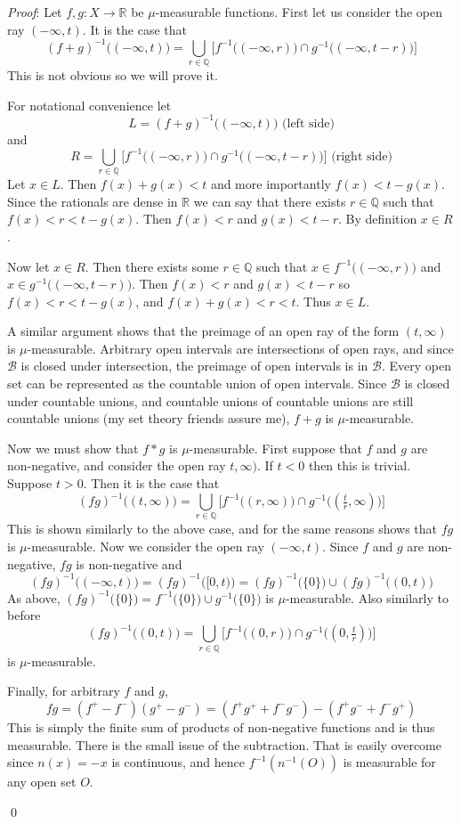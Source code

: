 \documentclass[12pt]{article}
\renewenvironment{proof}{\hspace{-4 ex} \emph{Proof}:}{\qed}
\newcommand{\RR}{\mathbb{R}}
\newcommand{\QQ}{\mathbb{Q}}
\newcommand{\BB}{\mathcal{B}}
\begin{document}
\begin{proof}
	Let $f,g: X \to \RR$ be $\mu$-measurable functions. First let us consider the open ray $(-\infty,t)$. It is the case that 
	$$
	(f+g)^{-1}\big ( (-\infty,t) \big) = \bigcup_{r \in \QQ} \Big[ f^{-1}\big( (-\infty,r) \big) \cap g^{-1}\big( (-\infty,t-r) \big) \Big]
	$$
	This is not obvious so we will prove it. \bigbreak
	
	For notational convenience let
	$$
	L = (f+g)^{-1}\big ( (-\infty,t) \big) \text{\ \ \ \ (left side)}
	$$
	and 
	$$
	R = \bigcup_{r \in \QQ} \Big[ f^{-1}\big( (-\infty,r) \big) \cap g^{-1}\big( (-\infty,t-r) \big) \Big] \text{\ \ \ \ \ (right side)}
	$$
	Let $x \in L$. Then $f(x)+g(x) < t$ and more importantly $f(x) < t - g(x)$. Since the rationals are dense in $\RR$ we can say that there exists $r \in \QQ$ such that $f(x) < r < t-g(x)$. Then $f(x) < r$ and $g(x) < t-r$. By definition $x \in R$. \bigbreak
	
	Now let $x \in R$. Then there exists some $r \in \QQ$ such that $x \in f^{-1}\big( (-\infty,r) \big)$ and $x \in g^{-1}\big( (-\infty,t-r) \big)$. Then $f(x)<r$ and $g(x)< t-r$ so $f(x) < r < t-g(x)$, and $f(x)+g(x) < r < t$. Thus $x \in L$. \bigbreak
	
	A similar argument shows that the preimage of an open ray of the form $(t, \infty)$ is $\mu$-measurable. Arbitrary open intervals are intersections of open rays, and since $\BB$ is closed under intersection, the preimage of open intervals is in $\BB$. Every open set can be represented as the countable union of open intervals. Since $\BB$ is closed under countable unions, and countable unions of countable unions are still countable unions (my set theory friends assure me), $f+g$ is $\mu$-measurable. \bigbreak
	
	Now we must show that $f*g$ is $\mu$-measurable. First suppose that $f$ and $g$ are non-negative, and consider the open ray $t,\infty)$. If $t<0$ then this is trivial. Suppose $t>0$. Then it is the case that
	$$
	(fg)^{-1}\big( (t,\infty) \big) = \bigcup_{r \in \QQ} \Big[ f^{-1}\big( (r, \infty) \big) \cap g^{-1}\big( (\tfrac{t}{r}, \infty) \big) \Big]
	$$
	This is shown similarly to the above case, and for the same reasons shows that $fg$ is $\mu$-measurable. Now we consider the open ray $(-\infty, t)$. Since $f$ and $g$ are non-negative, $fg$ is non-negative and 
	$$
	(fg)^{-1}\big( (-\infty, t) \big ) = (fg)^{-1}\big( [0, t) \big ) = (fg)^{-1}\big( \{0\} \big ) \cup (fg)^{-1}\big( (0, t) \big )
	$$
	As above, $(fg)^{-1}\big( \{0\} \big ) = f^{-1}\big( \{0\} \big ) \cup g^{-1}\big( \{0\} \big )$ is $\mu$-measurable. Also similarly to before
	$$
	(fg)^{-1}\big( (0, t) \big ) = \bigcup_{r \in \QQ} \Big[ f^{-1}\big( (0, r) \big) \cap g^{-1}\big( (0,\tfrac{t}{r}) \big) \Big]
	$$
	is $\mu$-measurable. \bigbreak
	
	Finally, for arbitrary $f$ and $g$, 
	$$
	fg = (f^+ - f^-)(g^+ - g^-) = (f^+g^+ + f^-g^-) - (f^+g^- + f^-g^+)
	$$
	This is simply the finite sum of products of non-negative functions and is thus measurable. There is the small issue of the subtraction. That is easily overcome since $n(x)=-x$ is continuous, and hence $f^{-1}(n^{-1}(O))$ is measurable for any open set $O$. 
	
\end{proof}
\end{document}
